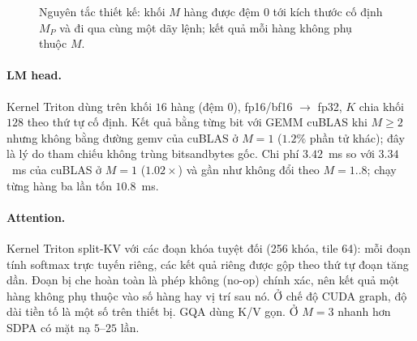 \begin{figure}[t]
\centering
{}
\caption{Nguyên tắc thiết kế: khối $M$ hàng được đệm $0$ tới kích thước cố định $M_P$ và đi qua cùng một dãy lệnh; kết quả mỗi hàng không phụ thuộc $M$.}\label{fig:k-principle}
\end{figure}

\paragraph{LM head.} Kernel Triton dùng  trên khối $16$ hàng (đệm $0$), fp16/bf16 $\to$ fp32, $K$ chia khối $128$ theo thứ tự cố định. Kết quả bằng từng bit với GEMM cuBLAS khi $M{\ge}2$ nhưng không bằng đường gemv của cuBLAS ở $M{=}1$ ($1.2\%$ phần tử khác); đây là lý do tham chiếu không trùng bitsandbytes gốc. Chi phí $3.42$~ms so với $3.34$~ms của cuBLAS ở $M{=}1$ ($1.02\times$) và gần như không đổi theo $M{=}1..8$; chạy từng hàng ba lần tốn $10.8$~ms.

\paragraph{Attention.} Kernel Triton split-KV với các đoạn khóa tuyệt đối (256 khóa, tile 64): mỗi đoạn tính softmax trực tuyến riêng, các kết quả riêng được gộp theo thứ tự đoạn tăng dần. Đoạn bị che hoàn toàn là phép không (no-op) chính xác, nên kết quả một hàng không phụ thuộc vào số hàng hay vị trí sau nó. Ở chế độ CUDA graph, độ dài tiền tố là một số  trên thiết bị. GQA dùng K/V gọn. Ở $M{=}3$ nhanh hơn SDPA có mặt nạ $5$--$25$ lần.

